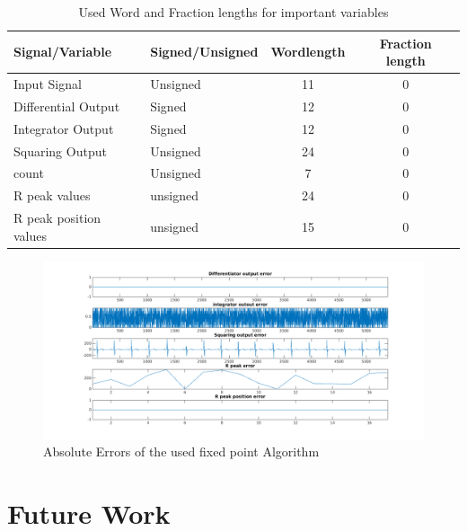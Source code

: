 \documentclass{article}
\begin{document}
\begin{table}
        \centering
        \begin{tabular}{l l c c }
                Signal/Variable & Signed/Unsigned & Wordlength & Fraction length \\
                \hline
                Input Signal & Unsigned & 11 & 0 \\
                Differential Output & Signed & 12 & 0 \\
                Integrator Output & Signed & 12 & 0 \\
                Squaring Output & Unsigned & 24 & 0 \\
                count & Unsigned & 7 & 0 \\
                R peak values & unsigned & 24 & 0 \\
                R peak position values & unsigned & 15 & 0 \\
        \end{tabular}
        \caption{Used Word and Fraction lengths for important variables}
        \label{tab:words}
\end{table}
\begin{figure}%
        \centerline{\includegraphics[scale=0.6]{./figs/fxpt_errors2.png}}
        \caption{Absolute Errors of the used fixed point Algorithm}
        \label{fig:errors}
\end{figure}




\section{Future Work} %

\newpage 



\end{document}
